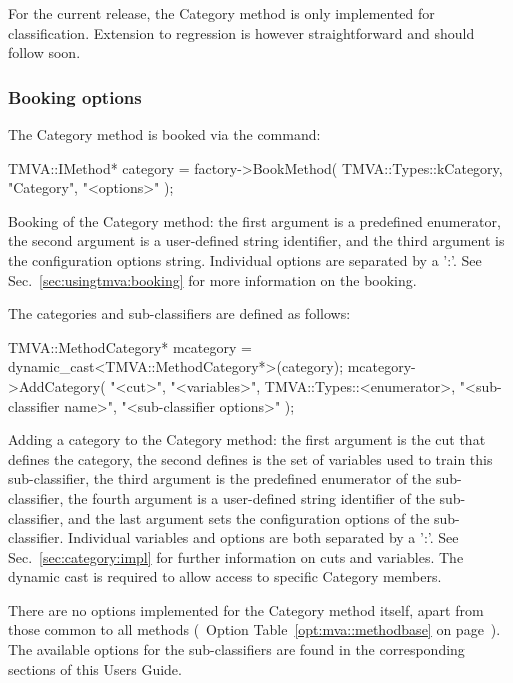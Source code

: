 For the current release, the Category method is only implemented for classification. 
Extension to regression is however straightforward and should follow soon. 

\subsubsection{Booking options}

The Category method is booked via the command:
\begin{codeexample}
\begin{tmvacode}
TMVA::IMethod* category = factory->BookMethod( TMVA::Types::kCategory, 
					       "Category",
					       "<options>" );
\end{tmvacode}
\caption[.]{\codeexampleCaptionSize Booking of the Category method: the first 
		   argument is a predefined enumerator, the second argument is a user-defined 
		   string identifier, and the third argument is the configuration options string.
         Individual options are separated by a ':'. 
         See Sec.~\ref{sec:usingtmva:booking} for more information on the booking.}
\end{codeexample}

The categories and sub-classifiers are defined as follows:
\begin{codeexample}
\begin{tmvacode}
TMVA::MethodCategory* mcategory = dynamic_cast<TMVA::MethodCategory*>(category);
mcategory->AddCategory( "<cut>",
		      "<variables>",
		      TMVA::Types::<enumerator>, 
		      "<sub-classifier name>", 
		      "<sub-classifier options>" );
\end{tmvacode}
\caption[.]{\codeexampleCaptionSize Adding a category to the Category method: 
         the first argument is the cut that defines the category, the second defines
         is the set of variables used to train this sub-classifier, the third argument 
         is the predefined enumerator of the sub-classifier, the fourth argument is a 
         user-defined string identifier of the sub-classifier, and the last argument
         sets the configuration options of the sub-classifier. Individual variables 
         and options are both separated by a ':'. See Sec.~\ref{sec:category:impl} 
         for further information on cuts and variables. The dynamic cast is required
         to allow access to specific Category members. }
\end{codeexample}

There are no options implemented for the Category method itself, apart from those 
common to all methods (\cf\  Option Table~\ref{opt:mva::methodbase} on 
page~\pageref{opt:mva::methodbase}). The available options for the sub-classifiers 
are found in the corresponding sections of this Users Guide.

